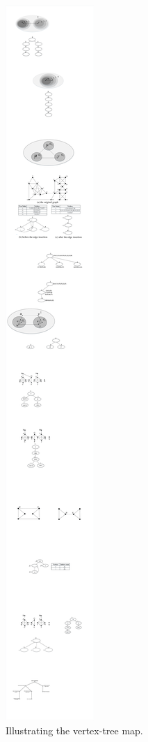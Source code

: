 \begin{figure}[ht]
    \centering
    \includegraphics[width=0.8\linewidth]{figures/traceChild}
    \caption{Illustrating the vertex-tree map.}
    \label{fig:trace}
\end{figure}


